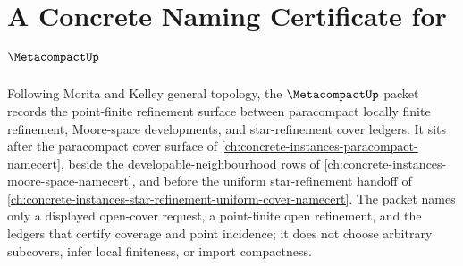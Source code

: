 \chapter{A Concrete Naming Certificate for $\MetacompactUp$}
\label{ch:concrete-instances-metacompact-namecert}

Following Morita and Kelley general topology, the $\MetacompactUp$ packet records the point-finite refinement surface between paracompact locally finite refinement, Moore-space developments, and star-refinement cover ledgers. It sits after the paracompact cover surface of \autoref{ch:concrete-instances-paracompact-namecert}, beside the developable-neighbourhood rows of \autoref{ch:concrete-instances-moore-space-namecert}, and before the uniform star-refinement handoff of \autoref{ch:concrete-instances-star-refinement-uniform-cover-namecert}. The packet names only a displayed open-cover request, a point-finite open refinement, and the ledgers that certify coverage and point incidence; it does not choose arbitrary subcovers, infer local finiteness, or import compactness.

